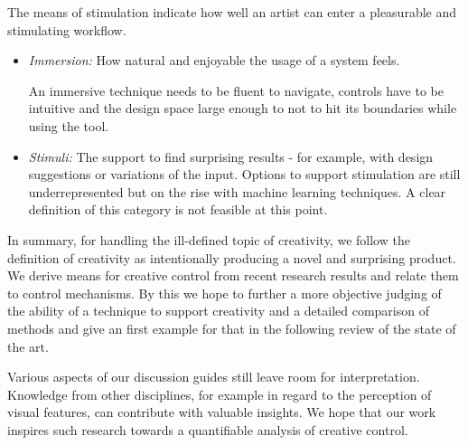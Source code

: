 The means of stimulation indicate how well an artist can enter a pleasurable and stimulating workflow.
\begin{itemize}
    \item \textit{Immersion:} How natural and enjoyable the usage of a system feels.

    An immersive technique needs to be fluent to navigate, controls have to be intuitive and the design space large enough to not to hit its boundaries while using the tool. 
    
    \item \textit{Stimuli:} The support to find surprising results - for example, with design suggestions or variations of the input. Options to support stimulation are still underrepresented but on the rise with machine learning techniques. A clear definition of this category is not feasible at this point.

\end{itemize}

In summary, for handling the ill-defined topic of creativity, we follow the definition of creativity as intentionally producing a novel and surprising product. We derive means for creative control from recent research results and relate them to control mechanisms. By this we hope to further a more objective judging of the ability of a technique to support creativity and a detailed comparison of methods and give an first example for that in the following review of the state of the art.

Various aspects of our discussion guides still leave room for interpretation. Knowledge from other disciplines, for example in regard to the perception of visual features, can contribute with valuable insights. We hope that our work inspires such research towards a quantifiable analysis of creative control.

